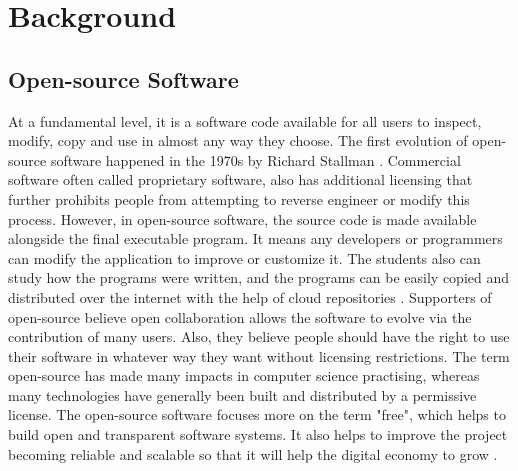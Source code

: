 %
\section{Background}\label{sec:background}
%
\subsection{Open-source Software}
At a fundamental level, it is a software code available for all users to inspect, modify, copy and use in almost any way they choose. The first evolution of open-source software happened in the 1970s by Richard Stallman \cite{zh2011}. Commercial software often called proprietary software, also has additional licensing that further prohibits people from attempting to reverse engineer or modify this process. However, in open-source software, the source code is made available alongside the final executable program. It means any developers or programmers can modify the application to improve or customize it. The students also can study how the programs were written, and the programs can be easily copied and distributed over the internet with the help of cloud repositories \cite{MiViIa2013}. Supporters of open-source believe open collaboration allows the software to evolve via the contribution of many users. Also, they believe people should have the right to use their software in whatever way they want without licensing restrictions. The term open-source has made many impacts in computer science practising, whereas many technologies have generally been built and distributed by a permissive license. The open-source software focuses more on the term "free", which helps to build open and transparent software systems. It also helps to improve the project becoming reliable and scalable so that it will help the digital economy to grow \cite{MiViIa2013}.
%
